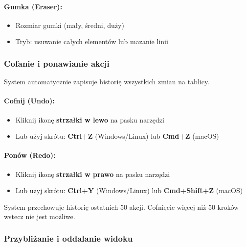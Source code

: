 \documentclass[12pt,a4paper]{article}
\begin{document}
\paragraph{Gumka (Eraser):}
\begin{itemize}
    \item Rozmiar gumki (mały, średni, duży)
    \item Tryb: usuwanie całych elementów lub mazanie linii
\end{itemize}

\subsubsection{Cofanie i ponawianie akcji}

System automatycznie zapisuje historię wszystkich zmian na tablicy.

\paragraph{Cofnij (Undo):}
\begin{itemize}
    \item Kliknij ikonę \textbf{strzałki w lewo} na pasku narzędzi
    \item Lub użyj skrótu: \textbf{Ctrl+Z} (Windows/Linux) lub \textbf{Cmd+Z} (macOS)
\end{itemize}

\paragraph{Ponów (Redo):}
\begin{itemize}
    \item Kliknij ikonę \textbf{strzałki w prawo} na pasku narzędzi
    \item Lub użyj skrótu: \textbf{Ctrl+Y} (Windows/Linux) lub \textbf{Cmd+Shift+Z} (macOS)
\end{itemize}

\begin{tcolorbox}[colback=yellow!10!white,colframe=orange!75!black,title=\faExclamationTriangle\ Uwaga]
System przechowuje historię ostatnich 50 akcji. Cofnięcie więcej niż 50 kroków wstecz nie jest możliwe.
\end{tcolorbox}

\subsubsection{Przybliżanie i oddalanie widoku}
\end{document}
